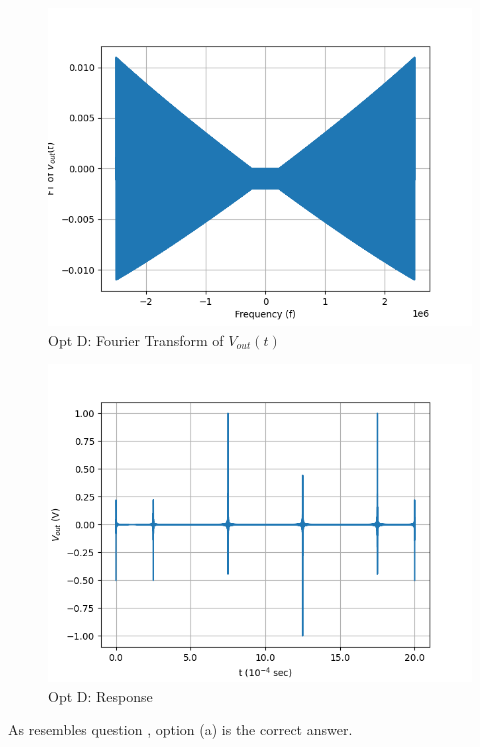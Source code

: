 \documentclass[journal,12pt,twocolumn]{IEEEtran}
\theoremstyle{remark}
\begin{document}
\begin{figure}[!h]
    \centering
    \includegraphics[width = \columnwidth]{figs/opt_d_ft.png}
    \caption{Opt D: Fourier Transform of $V_{out}(t)$}
    \label{fig:d_ft_gate.ph.23.37}
\end{figure}
\begin{figure}[!h]
    \centering
    \includegraphics[width = \columnwidth]{figs/opt_d_res.png}
    \caption{Opt D: Response}
    \label{fig:d_res_gate.ph.23.37}
\end{figure}

As  resembles question , option (a) is the correct answer.
\end{document}
